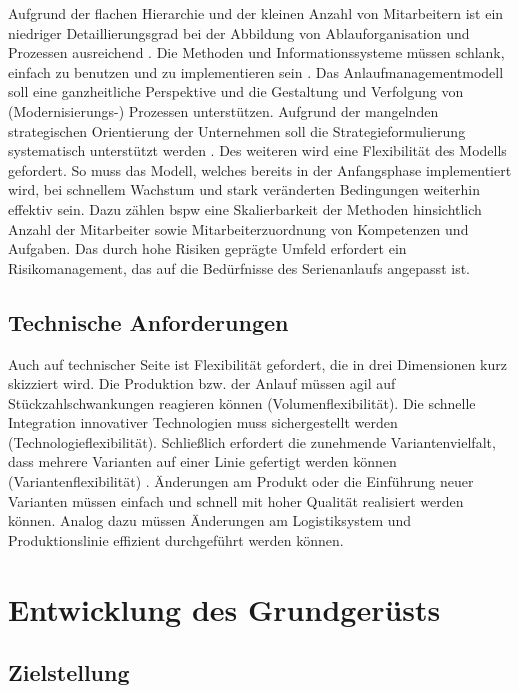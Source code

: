 Aufgrund der flachen Hierarchie und der kleinen Anzahl von Mitarbeitern ist ein niedriger Detaillierungsgrad bei der Abbildung von Ablauforganisation und Prozessen ausreichend \cite[151]{Dombrowski2009a}. 
Die Methoden und Informationssysteme müssen schlank, einfach zu benutzen und zu implementieren sein \cite[4]{Zimolong2007}. 
Das Anlaufmanagementmodell soll eine ganzheitliche Perspektive und die Gestaltung und Verfolgung von (Modernisierungs-) Prozessen unterstützen. Aufgrund der mangelnden strategischen Orientierung der Unternehmen soll die Strategieformulierung systematisch unterstützt werden \cite[47-48]{Dombrowski2009a}.
Des weiteren wird eine Flexibilität des Modells gefordert. So muss das Modell, welches bereits in der Anfangsphase implementiert wird, bei schnellem Wachstum und stark veränderten Bedingungen weiterhin effektiv sein. Dazu zählen \gls{bspw} eine Skalierbarkeit der Methoden hinsichtlich Anzahl der Mitarbeiter sowie Mitarbeiterzuordnung von Kompetenzen und Aufgaben. 
Das durch hohe Risiken geprägte Umfeld erfordert ein Risikomanagement, das auf die Bedürfnisse des Serienanlaufs angepasst ist. 


\subsection*{Technische Anforderungen}

Auch auf technischer Seite ist Flexibilität gefordert, die in drei Dimensionen kurz skizziert wird. 
Die Produktion bzw. der Anlauf müssen agil auf Stückzahlschwankungen reagieren können (Volumenflexibilität). Die schnelle Integration innovativer Technologien muss sichergestellt werden (Technologieflexibilität). Schließlich erfordert die zunehmende Variantenvielfalt, dass mehrere Varianten auf einer Linie gefertigt werden können (Variantenflexibilität) \cite[22]{Scholz2010}.
Änderungen am Produkt oder die Einführung neuer Varianten müssen einfach und schnell mit hoher Qualität realisiert werden können. Analog dazu müssen Änderungen am Logistiksystem und Produktionslinie effizient durchgeführt werden können.  

\section{Entwicklung des Grundgerüsts}\label{sec:grundgeruest}
\subsection*{Zielstellung}

